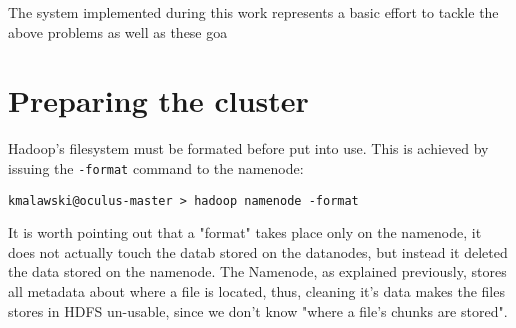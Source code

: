 The system implemented during this work represents a basic effort to tackle the above problems as well as these goa



\chapter{Preparing the cluster}

Hadoop's filesystem must be formated before put into use. This is achieved by issuing the \verb|-format| command to the namenode:

\begin{verbatim}
kmalawski@oculus-master > hadoop namenode -format
\end{verbatim}

It is worth pointing out that a "format" takes place only on the namenode, it does not actually touch the datab stored on the datanodes,
but instead it deleted the data stored on the namenode. The Namenode, as explained previously, stores all metadata about where a file is located,
thus, cleaning it's data makes the files stores in HDFS un-usable, since we don't know "where a file's chunks are stored".